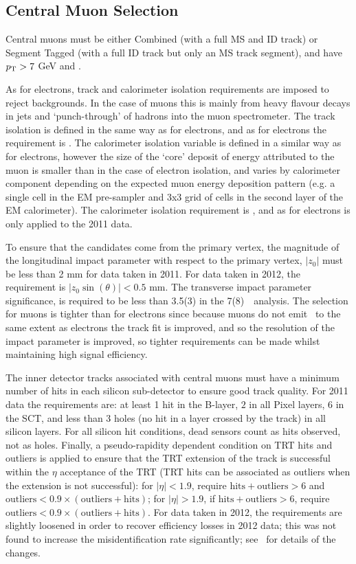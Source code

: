 \subsection{Central Muon Selection}

Central muons must be either Combined (with a full MS and ID track) or Segment
Tagged (with a full ID track but only an MS track segment), and have $p_{\mathrm{T}}>7$ GeV
and .

As for electrons, track and calorimeter isolation requirements are imposed to
reject backgrounds. In the case of muons this is mainly from heavy flavour
decays in jets and `punch-through' of hadrons into the muon spectrometer.  The
track isolation is defined in the same way as for electrons, and as for
electrons the requirement
is .  The calorimeter isolation variable is defined in a
similar way as for electrons, however the size of the `core' deposit of energy
attributed to the muon is smaller than in the case of electron isolation, and
varies by calorimeter component depending on the expected muon energy deposition
pattern (e.g. a single cell in the EM pre-sampler and 3x3 grid of cells in the second
layer of the EM calorimeter). The calorimeter isolation requirement is
, and as for electrons is only applied to the 2011 data.

To ensure that the candidates come from the primary vertex, the magnitude of the
longitudinal impact parameter with respect to the primary vertex, $|z_0|$ must
be less than 2 mm for data taken in 2011. For data taken in 2012, the
requirement is $|z_0\sin(\theta)|<0.5$ mm. The transverse impact parameter
significance, \dzerosig is required to be less than 3.5(3) in the 7(8)~\tev\
analysis. The selection for muons is tighter than for electrons since because
muons do not emit \brem\ to the same extent as electrons the track fit is
improved, and so the resolution of the impact parameter is improved, so tighter
requirements can be made whilst maintaining high signal efficiency.

The inner detector tracks associated with central muons must have a minimum
number of hits in each silicon sub-detector to ensure good track quality. For
2011 data the requirements are: at least 1 hit in the B-layer, $2$ in all Pixel
layers, $6$ in the SCT, and less than 3 holes (no hit in a layer crossed by the
track) in all silicon layers. For all silicon hit conditions, dead sensors count
as hits observed, not as holes.  Finally, a pseudo-rapidity dependent condition
on TRT hits and outliers is applied to ensure that the TRT extension of the
track is successful within the $\eta$ acceptance of the TRT (TRT hits can be
associated as outliers when the extension is not successful): for $|\eta| <
1.9$, require $\mathrm{hits}+\mathrm{outliers} > 6$ and $\mathrm{outliers} < 0.9
\times (\mathrm{outliers}+\mathrm{hits})$; for $|\eta| > 1.9$, if
$\mathrm{hits}+\mathrm{outliers} > 6$, require $\mathrm{outliers} < 0.9 \times
(\mathrm{outliers}+\mathrm{hits})$. For data taken in 2012, the
requirements are slightly loosened in order to recover efficiency losses in 2012
data; this was not found to increase the misidentification rate significantly;
see~\tab{objsel-mu} for details of the changes.

